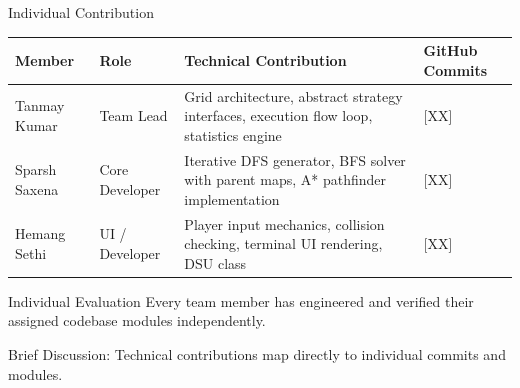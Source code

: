 \documentclass[aspectratio=169,11pt]{beamer}
\newcommand{\ph}[1]{[#1]}
\newcommand{\smallnote}[1]{%
\vspace{0.08cm}
{\scriptsize\color{GEUGrey}#1}
}
\begin{document}
\begin{frame}{Individual Contribution}

\scriptsize

\begin{center}

\renewcommand{\arraystretch}{1.35}

\begin{tabularx}{.96\textwidth}
{@{}R{2.2cm}R{1.8cm}Y R{1.6cm}@{}}

\toprule
Member &
Role &
Technical Contribution &
GitHub Commits\\
\midrule

Tanmay Kumar &
Team Lead &
Grid architecture, abstract strategy interfaces, execution flow loop, statistics engine &
\ph{XX}\\

Sparsh Saxena &
Core Developer &
Iterative DFS generator, BFS solver with parent maps, A* pathfinder implementation &
\ph{XX}\\

Hemang Sethi &
UI / Developer &
Player input mechanics, collision checking, terminal UI rendering, DSU class &
\ph{XX}\\

\bottomrule

\end{tabularx}

\end{center}

\vspace{3mm}

\begin{block}{Individual Evaluation}
Every team member has engineered and verified their assigned codebase modules independently.
\end{block}

\smallnote{
Brief Discussion: Technical contributions map directly to individual commits and modules.
}

\end{frame}
\end{document}

